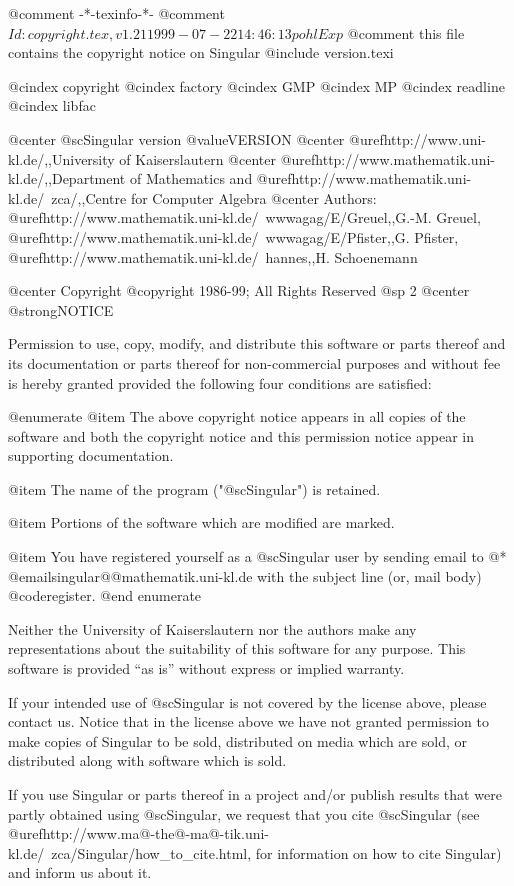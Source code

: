 @comment -*-texinfo-*-
@comment $Id: copyright.tex,v 1.21 1999-07-22 14:46:13 pohl Exp $
@comment this file contains the copyright notice on Singular
@include version.texi

@cindex copyright
@cindex factory
@cindex GMP
@cindex MP
@cindex readline
@cindex libfac

@center @sc{Singular} version @value{VERSION}
@center @uref{http://www.uni-kl.de/,,University of Kaiserslautern}
@center @uref{http://www.mathematik.uni-kl.de/,,Department of Mathematics} and  @uref{http://www.mathematik.uni-kl.de/~zca/,,Centre for Computer Algebra}
@center Authors: @uref{http://www.mathematik.uni-kl.de/~wwwagag/E/Greuel,,G.-M. Greuel}, @uref{http://www.mathematik.uni-kl.de/~wwwagag/E/Pfister,,G. Pfister}, @uref{http://www.mathematik.uni-kl.de/~hannes,,H. Schoenemann}

@center Copyright @copyright{} 1986-99; All Rights Reserved
@sp 2
@center @strong{NOTICE}

Permission to use, copy, modify, and distribute this software or parts
thereof and its documentation or parts thereof for non-commercial
purposes and without fee is hereby granted provided the following four
conditions are satisfied:

@enumerate
@item
The above copyright notice appears in all copies of the software
and both the copyright notice and this permission notice
appear in supporting documentation.

@item
The name of the program ("@sc{Singular}") is retained.

@item
Portions of the software which are modified are marked.

@item
You have registered yourself as a @sc{Singular} user by sending email to @*
@email{singular@@mathematik.uni-kl.de}
with the subject line (or, mail body)
@code{register}.
@end enumerate

Neither the University of Kaiserslautern nor the authors make any
representations about the suitability of this software for any
purpose.  This software is provided ``as is'' without express or
implied warranty.

If your intended use of @sc{Singular} is not covered by the license above,
please contact us.  Notice that in the license above we have not
granted permission to make copies of Singular to be sold, distributed
on media which are sold, or distributed along with software which is
sold.

If you use Singular or parts thereof in a project and/or publish
results that were partly obtained using @sc{Singular}, we request that you
cite @sc{Singular} (see
@uref{http://www.ma@-the@-ma@-tik.uni-kl.de/~zca/Singular/how_to_cite.html, for information}
 on how to cite Singular) and inform us about it.

